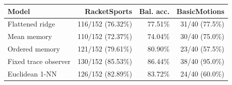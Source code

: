 \begin{tabular}{lrrr}\toprule
Model & RacketSports & Bal. acc. & BasicMotions \\
\midrule
Flattened ridge & 116/152 (76.32\%) & 77.51\% & 31/40 (77.5\%) \\
Mean memory & 110/152 (72.37\%) & 74.04\% & 30/40 (75.0\%) \\
Ordered memory & 121/152 (79.61\%) & 80.90\% & 23/40 (57.5\%) \\
Fixed trace observer & 130/152 (85.53\%) & 86.44\% & 38/40 (95.0\%) \\
Euclidean 1-NN & 126/152 (82.89\%) & 83.72\% & 24/40 (60.0\%) \\
\bottomrule\end{tabular}
